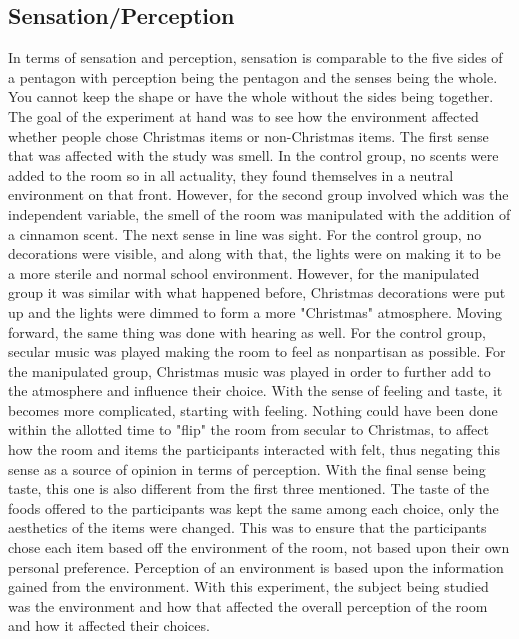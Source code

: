 \documentclass[twoside]{article}
\begin{document}
\begin{multicols}{2}
\subsection{Sensation/Perception}

In terms of sensation and perception, sensation is comparable to the five sides of a pentagon with perception being the pentagon and the senses being the whole. You cannot keep the shape or have the whole without the sides being together. The goal of the experiment at hand was to see how the environment affected whether people chose Christmas items or non-Christmas items. The first sense that was affected with the study was smell. In the control group, no scents were added to the room so in all actuality, they found themselves in a neutral environment on that front. However, for the second group involved which was the independent variable, the smell of the room was manipulated with the addition of a cinnamon scent. The next sense in line was sight. For the control group, no decorations were visible, and along with that, the lights were on making it to be a more sterile and normal school environment. However, for the manipulated group it was similar with what happened before, Christmas decorations were put up and the lights were dimmed to form a more "Christmas" atmosphere. Moving forward, the same thing was done with hearing as well. For the control group, secular music was played making the room to feel as nonpartisan as possible. For the manipulated group, Christmas music was played in order to further add to the atmosphere and influence their choice. With the sense of feeling and taste, it becomes more complicated, starting with feeling. Nothing could have been done within the allotted time to "flip" the room from secular to Christmas, to affect how the room and items the participants interacted with felt, thus negating this sense as a source of opinion in terms of perception. With the final sense being taste, this one is also different from the first three mentioned. The taste of the foods offered to the participants was kept the same among each choice, only the aesthetics of the items were changed. This was to ensure that the participants chose each item based off the environment of the room, not based upon their own personal preference. Perception of an environment is based upon the information gained from the environment. With this experiment, the subject being studied was the environment and how that affected the overall perception of the room and how it affected their choices.


\end{multicols}
\end{document}
